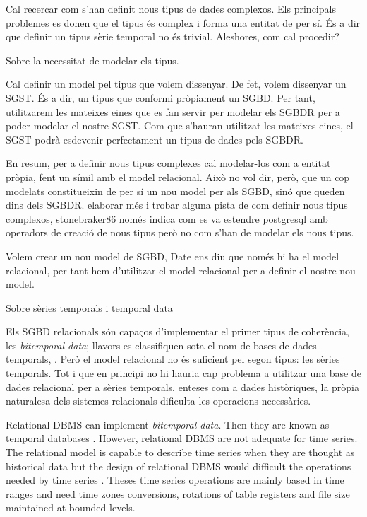 Cal recercar com s'han definit nous tipus de dades complexos. Els principals problemes es donen que el tipus és complex i forma una entitat de per sí. És a dir que definir un tipus sèrie temporal no és trivial. Aleshores, com cal procedir?



Sobre la necessitat de modelar els tipus.

Cal definir un model pel tipus que volem dissenyar.
De fet, volem dissenyar un SGST. És a dir, un tipus que conformi pròpiament un SGBD. Per tant, utilitzarem les mateixes eines que es fan servir per modelar els SGBDR per a poder modelar el nostre SGST. Com que s'hauran utilitzat les mateixes eines, el SGST podrà esdevenir perfectament un tipus de dades pels SGBDR.

En resum, per a definir nous tipus complexes cal modelar-los com a entitat pròpia, fent un símil amb el model relacional. Això no vol dir, però, que un cop modelats constitueixin de per sí un nou model per als SGBD, sinó que queden dins dels SGBDR.  elaborar més i trobar alguna pista de com definir nous tipus complexos, stonebraker86 només indica com es va estendre postgresql amb operadors de creació de nous tipus però no com s'han de modelar els nous tipus.

Volem crear un nou model de SGBD, Date ens diu que només hi ha el model relacional, per tant hem d'utilitzar el model relacional per a definir el nostre nou model.


Sobre sèries temporals i temporal data\cite{assfalg08:thesis}

Els SGBD relacionals són capaços d'implementar el primer tipus de coherència, les \emph{bitemporal data}; llavors es classifiquen sota el nom de bases de dades temporals, \cite{date,wiki:temporal_database}. Però el model relacional no és suficient pel segon tipus: les sèries temporals. Tot i que en principi no hi hauria cap problema a utilitzar una base de dades relacional per a sèries temporals, enteses com a dades històriques, la pròpia naturalesa dels sistemes relacionals  dificulta les operacions necessàries. 


Relational DBMS can implement \emph{bitemporal data}. Then they are known as temporal databases \parencite[ch.\ 22]{date}. However, relational DBMS are not adequate for time series. The relational model is capable to describe time series when they are thought as historical data but the design of relational DBMS would difficult the operations  needed by time series \parencite{schmidt95}. Theses time series operations are mainly based in time ranges and need time zones conversions, rotations of table registers and file size maintained at bounded levels.


